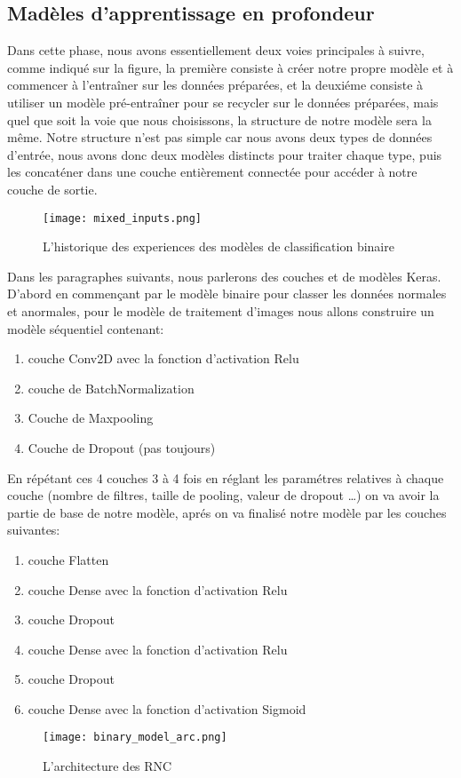 \subsection{Madèles d'apprentissage en profondeur}
Dans cette phase, nous avons essentiellement deux voies principales à suivre, comme indiqué sur la figure, la première consiste à créer notre propre modèle et à commencer à l'entraîner sur les données préparées, et la deuxiéme consiste à utiliser un modèle pré-entraîner pour se recycler sur le données préparées, mais quel que soit la voie que nous choisissons, la structure de notre modèle sera la même.
Notre structure n'est pas simple car nous avons deux types de données d'entrée, nous avons donc deux modèles distincts pour traiter chaque type, puis les concaténer dans une couche entièrement connectée pour accéder à notre couche de sortie.
\begin{figure}[H]
    \centering
    \texttt{[image: mixed\_inputs.png]}
    \caption{L'historique des experiences des modèles de classification binaire}\label{fig:binary_history}
\end{figure}
Dans les paragraphes suivants, nous parlerons des couches et de modèles Keras.
D’abord en commençant par le modèle binaire pour classer les données normales et anormales, pour le modèle de traitement d'images nous allons construire un modèle séquentiel contenant:
\begin{enumerate}
    \item couche Conv2D avec la fonction d'activation Relu
    \item couche de BatchNormalization
    \item Couche de Maxpooling
    \item Couche de Dropout (pas toujours)
\end{enumerate}
En répétant ces 4 couches 3 à 4 fois en réglant les paramétres relatives à chaque couche (nombre de filtres, taille de pooling, valeur de dropout …) on va avoir la partie de base de notre modèle, aprés on va finalisé notre modèle par les couches suivantes:
\begin{enumerate}
    \item couche Flatten
    \item couche Dense avec la fonction d'activation Relu
    \item couche Dropout
    \item couche Dense avec la fonction d'activation Relu
    \item couche Dropout
    \item couche Dense avec la fonction d'activation Sigmoid
\end{enumerate}
\begin{figure}[H]
    \centering
    \texttt{[image: binary\_model\_arc.png]}
    \caption{L'architecture des RNC}\label{fig:binary_history}
\end{figure}

